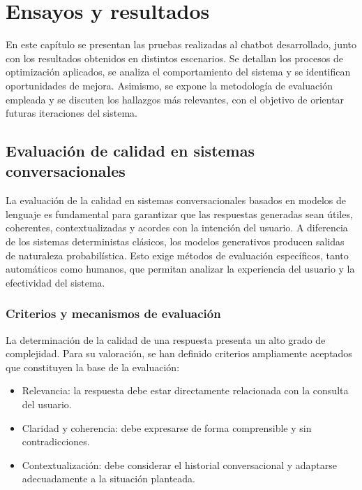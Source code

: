 \chapter{Ensayos y resultados}
\label{Chapter4}

En este capítulo se presentan las pruebas realizadas al chatbot desarrollado, junto con los resultados obtenidos en distintos escenarios. Se detallan los procesos de optimización aplicados, se analiza el comportamiento del sistema y se identifican oportunidades de mejora. Asimismo, se expone la metodología de evaluación empleada y se discuten los hallazgos más relevantes, con el objetivo de orientar futuras iteraciones del sistema.


\section{Evaluación de calidad en sistemas conversacionales}

La evaluación de la calidad en sistemas conversacionales basados en modelos de lenguaje es fundamental para garantizar que las respuestas generadas sean útiles, coherentes, contextualizadas y acordes con la intención del usuario. A diferencia de los sistemas deterministas clásicos, los modelos generativos producen salidas de naturaleza probabilística. Esto exige métodos de evaluación específicos, tanto automáticos como humanos, que permitan analizar la experiencia del usuario y la efectividad del sistema.

\subsection{Criterios y mecanismos de evaluación}

La determinación de la calidad de una respuesta presenta un alto grado de complejidad. Para su valoración, se han definido criterios ampliamente aceptados que constituyen la base de la evaluación:

\begin{itemize}
    \item Relevancia: la respuesta debe estar directamente relacionada con la consulta del usuario.
    \item Claridad y coherencia: debe expresarse de forma comprensible y sin contradicciones.
    \item Contextualización: debe considerar el historial conversacional y adaptarse adecuadamente a la situación planteada.
\end{itemize}

